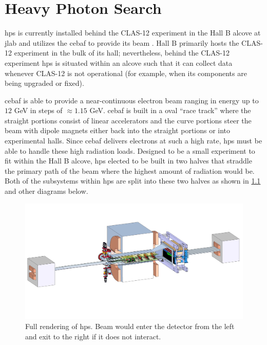 \chapter{Heavy Photon Search}
\label{chapter:hps:experiment}
\ac{hps} is currently installed behind the CLAS-12 experiment in the Hall B
alcove at \ac{jlab} and utilizes the \ac{cebaf} to provide its beam
\cite{mrsolt-thesis-2020,skmccarty-thesis-2020}.
Hall B primarily hosts the CLAS-12 experiment 
in the bulk of its hall; nevertheless, behind the CLAS-12 experiment \ac{hps} is situated
within an alcove such that it can collect data whenever CLAS-12 is not operational (for example,
when its components are being upgraded or fixed).

\ac{cebaf} \cite{cebaf-12GeV-2012,cebaf-opportunities-2012,cebaf-2013} is able to
provide a near-continuous electron beam ranging in energy up to $12$ GeV in steps
of $\approx 1.15$ GeV. \ac{cebaf} is built in a oval ``race track'' where the straight
portions consist of linear accelerators and the curve portions steer the beam with
dipole magnets either back into the straight portions or into experimental halls.
Since \ac{cebaf} delivers electrons at such a high rate, \ac{hps} must be able to
handle these high radiation loads. Designed to be a small experiment to fit within
the Hall B alcove, \ac{hps} elected to be built in two halves that straddle the primary
path of the beam where the highest amount of radiation would be. Both of the subsystems
within \ac{hps} are split into these two halves as shown in \cref{fig:hps-full-render}
and other diagrams below.

\begin{figure}
    \centering
    \includegraphics[trim={15cm 10cm 10cm 5cm},clip,width=\textwidth]{figures/hps/experiment/hps_full_render.jpg}
    \caption{
        Full rendering of \ac{hps}.
        Beam would enter the detector from the left and exit to the right if it does not interact.
    }
    \label{fig:hps-full-render}
\end{figure}

